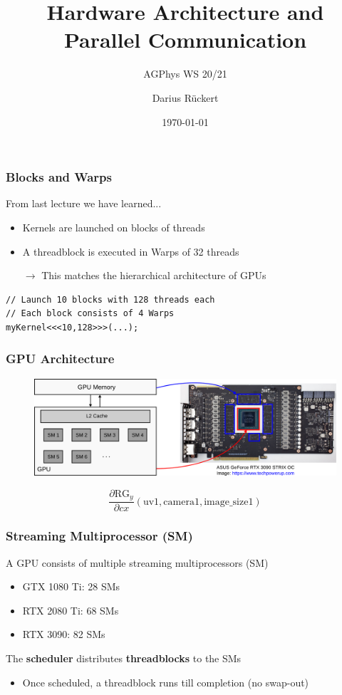 \documentclass[aspectratio=169,handout]{beamer}
\subtitle{AGPhys WS 20/21}
\title{Hardware Architecture and Parallel Communication}
\author[Darius Rückert]{Darius Rückert}
\date{\today}
\begin{document}
\frame
{
	\titlepage
}


\begin{frame}[fragile]
	\frametitle{Blocks and Warps}
	From last lecture we have learned...
	\begin{itemize}
		\item Kernels are launched on blocks of threads
		\item A threadblock is executed in Warps of 32 threads
		\item [$\rightarrow$] This matches the hierarchical architecture of GPUs
	\end{itemize}
	
\begin{lstlisting}
// Launch 10 blocks with 128 threads each
// Each block consists of 4 Warps
myKernel<<<10,128>>>(...);
\end{lstlisting}
	
\end{frame}

\frame
{
	\frametitle{GPU Architecture}
	\begin{figure}
		\includegraphics[width=1.0\textwidth]{arch}
	\end{figure}

\[ \frac{\partial \text{RG}_y}{\partial cx} (\text{uv1}, \text{camera1}, \text{image\_size1}) \]

}

\begin{frame}[fragile]
	\frametitle{Streaming Multiprocessor (SM)}
	A GPU consists of multiple streaming multiprocessors (SM)
	\begin{itemize}
		\item GTX 1080 Ti: 28 SMs
		\item RTX 2080 Ti: 68 SMs
		\item RTX 3090: 82 SMs
	\end{itemize}
	The \textbf{scheduler} distributes \textbf{threadblocks} to the SMs
		\begin{itemize}
			\item Once scheduled, a threadblock runs till completion (no swap-out)
		\end{itemize}
\end{frame}
\end{document}
